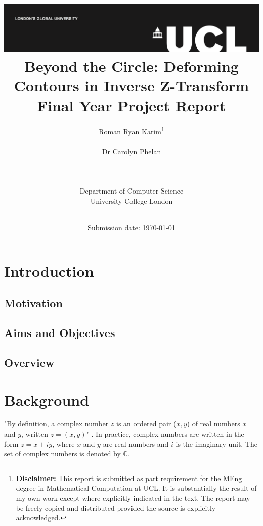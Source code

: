 \documentclass[a4paper]{report}
\title{{\vspace{-14em} \includegraphics[scale=0.4]{Logos/ucl_logo.png}}\\
{{\vspace{2em} \Huge Beyond the Circle: Deforming Contours in Inverse Z-Transform}}\\
{\large Final Year Project Report}\\
}
\date{Submission date: \today}
\author{Roman Ryan Karim\thanks{
{\bf Disclaimer:}
This report is submitted as part requirement for the MEng degree in Mathematical Computation at UCL. It is substantially the result of my own work except where explicitly indicated in the text. The report may be freely copied and distributed provided the source is explicitly acknowledged.}
\\ \\ Dr Carolyn Phelan
\\ \\ \\ \\ Department of Computer Science
\\ University College London
\\ \\
}
\begin{document}
 
\onehalfspacing
\maketitle
\begin{abstract}

\end{abstract}

\tableofcontents
\setcounter{page}{1}

\chapter{Introduction}
\section{Motivation}



\section{Aims and Objectives}


\section{Overview}


\chapter{Background}
"By definition, a complex number $z$ is an ordered pair ($x, y$) of real numbers $x$ and $y$, written $z = (x, y)$" \cite{kreyszig2010advanced}. In practice, complex numbers are written in the form $z = x + iy$, where $x$ and $y$ are real numbers and $i$ is the imaginary unit. The set of complex numbers is denoted by $\mathbb{C}$.
\end{document}
